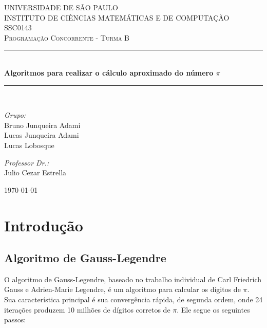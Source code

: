 \documentclass[a4paper]{article}
\newcommand{\HRule}{\rule{\linewidth}{0.5mm}}
\begin{document}
\begin{titlepage}
\begin{center}	

\textsc{\Large UNIVERSIDADE DE SÃO PAULO\\
	INSTITUTO DE CIÊNCIAS MATEMÁTICAS E DE COMPUTAÇÃO}\\[0.7cm]

\textsc{\Large SSC0143}\\[0.2cm]
\textsc{\Large Programação Concorrente - Turma B}\\[0.5cm]

\HRule \\[0.4cm]
{ \huge \bfseries Algoritmos para realizar o cálculo aproximado do número \begin{math}\pi\end{math}}\\[0.4cm]
\HRule \\[1.5cm]

\begin{minipage}{0.4\textwidth}
\begin{flushleft} \large
\emph{Grupo:}\\
Bruno Junqueira Adami\\
Lucas Junqueira Adami\\
Lucas Lobosque
\end{flushleft}
\end{minipage}
\begin{minipage}{0.4\textwidth}
\begin{flushright} \large
\emph{Professor Dr.:}\\
Julio Cezar Estrella
\end{flushright}
\end{minipage}

\vfill

{\large \today}
	
\end{center}
\end{titlepage}

\section{Introdução}
\subsection{Algoritmo de Gauss-Legendre}
O algoritmo de Gauss-Legendre, baseado no trabalho individual de Carl Friedrich Gauss 
e Adrien-Marie Legendre, é um algoritmo para calcular os dígitos de \begin{math}\pi\end{math}. Sua
característica principal é sua convergência rápida, de segunda ordem, onde 24 
iterações produzem 10 milhões de dígitos corretos de \begin{math}\pi\end{math}. Ele segue os seguintes 
passos:
\end{document}
